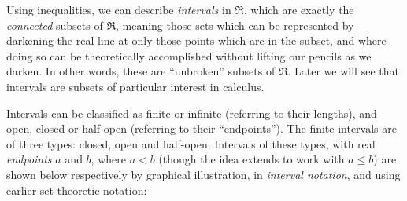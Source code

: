 Using inequalities, we can describe {\it intervals} in $\Re$,
which are exactly the {\it connected} subsets of $\Re$, meaning
those sets which can be represented by darkening the 
real line at only those points which are in the subset, and
where doing so can be theoretically accomplished without
lifting our pencils as we darken.  In other words, these
are ``unbroken'' subsets of $\Re$.
Later we will see that intervals are subsets of particular interest
in calculus.


Intervals can be classified as finite or infinite (referring to
their lengths), and open, closed or half-open (referring to 
their ``endpoints'').  The finite intervals are of
three types: closed, open and half-open.  Intervals of 
these types, with real {\it endpoints} $a$ and $b$,
where $a<b$ (though the idea extends to work with $a\le b$)
are shown below respectively by graphical 
illustration, in {\it interval notation},
and using earlier set-theoretic notation:


